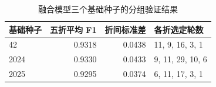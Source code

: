 \begin{table}[htbp]\centering\small
\caption{融合模型三个基础种子的分组验证结果}\label{tab:seeds}
\begin{tabular}{lrrl}\toprule
基础种子 & 五折平均 F1 & 折间标准差 & 各折选定轮数\\\midrule
42 & 0.9318 & 0.0438 & 11, 9, 16, 3, 1\\
2024 & 0.9330 & 0.0433 & 9, 11, 29, 10, 6\\
2025 & 0.9295 & 0.0374 & 6, 11, 17, 3, 1\\
\bottomrule\end{tabular}
\end{table}
